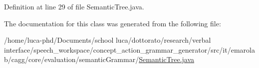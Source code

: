Definition at line 29 of file Semantic\-Tree.\-java.



The documentation for this class was generated from the following file\-:\begin{DoxyCompactItemize}
\item 
/home/luca-\/phd/\-Documents/school luca/dottorato/research/verbal interface/speech\-\_\-workspace/concept\-\_\-action\-\_\-grammar\-\_\-generator/src/it/emarolab/cagg/core/evaluation/semantic\-Grammar/\hyperlink{SemanticTree_8java}{Semantic\-Tree.\-java}\end{DoxyCompactItemize}
